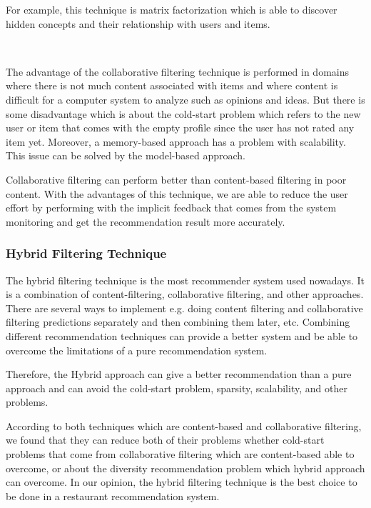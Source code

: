 \documentclass[12pt,oneside,openright,a4paper]{cpe-english-project}
\begin{document}
For example, this technique is matrix factorization which is able to discover hidden concepts and their relationship with users and items.

\

The advantage of the collaborative filtering technique is performed in domains where there is not much content associated with items and where content is difficult for a computer system to analyze such as opinions and ideas. \cite{Recommendersystem} But there is some disadvantage which is about the cold-start problem which refers to the new user or item that comes with the empty profile since the user has not rated any item yet. Moreover, a memory-based approach has a problem with scalability. This issue can be solved by the model-based approach.

Collaborative filtering can perform better than content-based filtering in poor content. With the advantages of this technique, we are able to reduce the user effort by performing with the implicit feedback that comes from the system monitoring and get the recommendation result more accurately.


\subsubsection{Hybrid Filtering Technique}

The hybrid filtering technique is the most recommender system used nowadays. It is a combination of content-filtering, collaborative filtering, and other approaches. There are several ways to implement e.g. doing content filtering and collaborative filtering predictions separately and then combining them later, etc. Combining different recommendation techniques can provide a better system and be able to overcome the limitations of a pure recommendation system.

Therefore, the Hybrid approach can give a better recommendation than a pure approach and can avoid the cold-start problem, sparsity, scalability, and other problems.

According to both techniques which are content-based and collaborative filtering, we found that they can reduce both of their problems whether cold-start problems that come from collaborative filtering which are content-based able to overcome, or about the diversity recommendation problem which hybrid approach can overcome. In our opinion, the hybrid filtering technique is the best choice to be done in a restaurant recommendation system.
        
\end{document}
